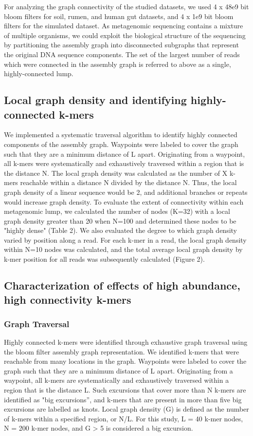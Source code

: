 \documentclass[11pt]{article} %
\begin{document}
For analyzing the graph connectivity of the studied datasets, we used 4 x 48e9 bit bloom filters for soil, rumen, and human gut datasets, and 4 x 1e9 bit bloom filters for the simulated dataset. As metagenomic sequencing contains a mixture of multiple organisms, we could exploit the biological structure of the sequencing by partitioning the assembly graph into disconnected subgraphs that represent the original DNA sequence components. The set of the largest number of reads which were connected in the assembly graph is referred to above as a single, highly-connected lump. 

\subsection{Local graph density and identifying highly-connected k-mers}
We implemented a systematic traversal algorithm to identify highly connected components of the assembly graph.  Waypoints were labeled to cover the graph such that they are a minimum distance of L apart. Originating from a waypoint, all k-mers were systematically and exhaustively traversed within a region that is the distance N.   The local graph density was calculated as the number of X k-mers reachable within a distance N divided by the distance N.  Thus, the local graph density of a linear sequence would be 2, and additional branches or repeats would increase graph density.   To evaluate the extent of connectivity within each metagenomic lump, we calculated the number of nodes (K=32) with a local graph density greater than 20 when N=100 and determined these nodes to be "highly dense" (Table 2).  We also evaluated the degree to which graph density varied by position along a read.  For each k-mer in a read, the local graph density within N=10 nodes was calculated, and the total average local graph density by k-mer position for all reads was subsequently calculated (Figure 2).

\subsection{Characterization of effects of high abundance, high connectivity k-mers}

\subsubsection{Graph Traversal}
 
Highly connected k-mers were identified through exhaustive graph traversal using the bloom filter assembly graph representation.  We identified k-mers that were reachable from many locations in the graph.  Waypoints were labeled to cover the graph such that they
are a minimum distance of L apart.  Originating from a waypoint, all k-mers are systematically and exhaustively traversed within a region that is the distance L.  Such excursions that cover more than N k-mers are identified as "big excursions'', and k-mers that are present
in more than five big excursions are labelled as knots.  Local graph density (G) is defined as the number of k-mers within a specified region, or N/L.   For this study, L = 40 k-mer nodes, N = 200 k-mer nodes, and G > 5 is considered a big excursion.  
\end{document}
